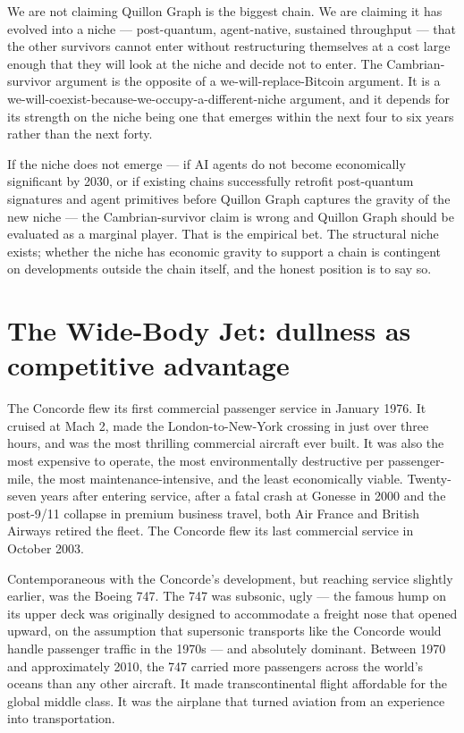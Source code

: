 \documentclass[11pt,a4paper]{article}
\begin{document}
We are not claiming Quillon Graph is the biggest chain. We are claiming
it has evolved into a niche --- post-quantum, agent-native, sustained
throughput --- that the other survivors cannot enter without
restructuring themselves at a cost large enough that they will look at
the niche and decide not to enter. The Cambrian-survivor argument is
the opposite of a we-will-replace-Bitcoin argument. It is a
we-will-coexist-because-we-occupy-a-different-niche argument, and it
depends for its strength on the niche being one that emerges within the
next four to six years rather than the next forty.

If the niche does not emerge --- if AI agents do not become economically
significant by 2030, or if existing chains successfully retrofit
post-quantum signatures and agent primitives before Quillon Graph
captures the gravity of the new niche --- the Cambrian-survivor claim is
wrong and Quillon Graph should be evaluated as a marginal player. That
is the empirical bet. The structural niche exists; whether the niche has
economic gravity to support a chain is contingent on developments
outside the chain itself, and the honest position is to say so.

\section{The Wide-Body Jet: dullness as competitive advantage}\label{sec:widebody}

The Concorde flew its first commercial passenger service in January 1976.
It cruised at Mach 2, made the London-to-New-York crossing in just over
three hours, and was the most thrilling commercial aircraft ever built.
It was also the most expensive to operate, the most environmentally
destructive per passenger-mile, the most maintenance-intensive, and the
least economically viable. Twenty-seven years after entering service,
after a fatal crash at Gonesse in 2000 and the post-9/11 collapse in
premium business travel, both Air France and British Airways retired the
fleet. The Concorde flew its last commercial service in October 2003.

Contemporaneous with the Concorde's development, but reaching service
slightly earlier, was the Boeing 747. The 747 was subsonic, ugly --- the
famous hump on its upper deck was originally designed to accommodate a
freight nose that opened upward, on the assumption that supersonic
transports like the Concorde would handle passenger traffic in the
1970s --- and absolutely dominant. Between 1970 and approximately 2010,
the 747 carried more passengers across the world's oceans than any other
aircraft. It made transcontinental flight affordable for the global
middle class. It was the airplane that turned aviation from an
experience into transportation.
\end{document}
